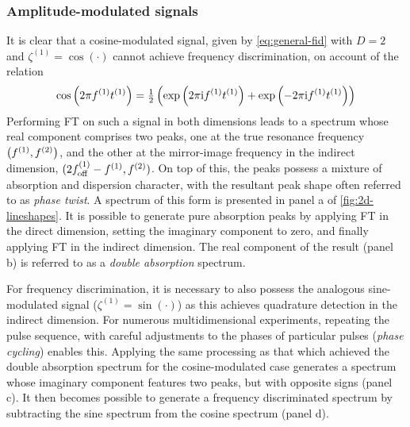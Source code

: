 \subsubsection{Amplitude-modulated signals}
It is clear that a cosine-modulated signal, given by \cref{eq:general-fid}
with $D=2$ and $\zeta^{(1)} = \cos(\cdot)$ cannot achieve frequency
discrimination, on account of the relation
\begin{equation}
    \cos\left(2 \pi f^{(1)} t^{(1)}\right) =
    \tfrac{1}{2} \left(\exp\left(2 \pi \mathrm{i} f^{(1)} t^{(1)} \right) + \exp\left(-2 \pi \mathrm{i}
    f^{(1)} t^{(1)} \right)\right)
\end{equation}
Performing \ac{FT} on such a signal in both dimensions leads to a spectrum
whose real component comprises two peaks, one at the true resonance frequency
$\left(f^{(1)}, f^{(2)}\right)$, and the other at the mirror-image frequency in the
indirect dimension, $(2f_{\mathrm{off}}^{(1)} - f^{(1)}, f^{(2)})$. On top of this, the
peaks possess a mixture of absorption and dispersion character, with the
resultant peak shape often referred to as \emph{phase twist}\cite{Keeler1985}.
A spectrum of this form is presented in panel a of \cref{fig:2d-lineshapes}.
It is possible to generate pure absorption peaks by applying \ac{FT} in the
direct dimension, setting the imaginary component to zero, and finally
applying \ac{FT} in the indirect dimension. The real component of the result
(panel b) is referred to as a \emph{double absorption} spectrum.

For frequency discrimination, it is necessary to also possess the
analogous sine-modulated signal ($\zeta^{(1)} = \sin(\cdot)$) as this
achieves quadrature detection in the indirect dimension. For
numerous multidimensional experiments, repeating the
pulse sequence, with careful adjustments to the phases of particular pulses
(\emph{phase cycling}) enables this\cite[Chapter 11]{Keeler2010}.
Applying the same processing as that which achieved the double absorption
spectrum for the cosine-modulated case generates a spectrum whose imaginary
component features two peaks, but with opposite signs (panel c).
It then becomes possible to generate a frequency discriminated spectrum by
subtracting the sine spectrum from the cosine spectrum (panel d).


